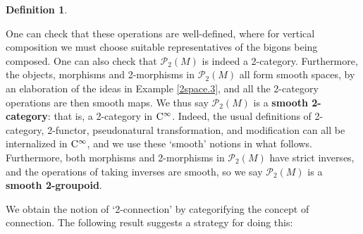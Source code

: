 \documentclass{article}
\renewcommand{\P}{\mathcal{P}}
\newtheorem{definition}[theorem]{Definition}
\def\of #1{\!\left({#1}\right)}
\begin{document}
\begin{definition}
\end{definition}

\noindent
One can check that these operations are well-defined, where
for vertical composition we must choose suitable representatives 
of the bigons being composed.  One can also check that
$\P_2(M)$ is indeed a 2-category.  Furthermore, 
the objects, morphisms and 2-morphisms in $\P_2(M)$ all form 
smooth spaces, by an elaboration of the ideas
in Example \ref{2space.3}, and all the 2-category operations are then 
smooth maps.   We thus say $\P_2(M)$ is a {\bf smooth 2-category}:
that is, a 2-category in ${\rm C}^\infty$.  Indeed, the usual definitions 
\cite{KellyStreet} of 2-category, 2-functor, pseudonatural transformation, 
and modification can all be internalized in ${\rm C}^\infty$, and we 
use these `smooth' notions in what follows.
Furthermore, both morphisms and 2-morphisms in $\P_2(M)$ have strict 
inverses, and the operations of taking inverses are smooth, so we say
$\P_2(M)$ is a {\bf smooth 2-groupoid}. 

We obtain the notion of `2-connection' by categorifying
the concept of connection.  The following result 
suggests a strategy for doing this:
\end{document}
